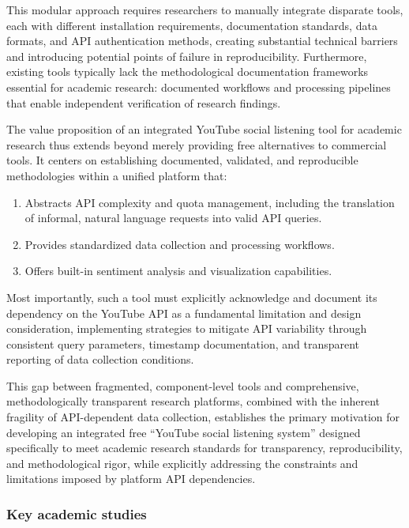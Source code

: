 This modular approach requires researchers to manually integrate disparate tools, each with different installation requirements, documentation standards, data formats, and API authentication methods, creating substantial technical barriers and introducing potential points of failure in reproducibility. Furthermore, existing tools typically lack the methodological documentation frameworks essential for academic research: documented workflows and processing pipelines that enable independent verification of research findings.

The value proposition of an integrated YouTube social listening tool for academic research thus extends beyond merely providing free alternatives to commercial tools. It centers on establishing documented, validated, and reproducible methodologies within a unified platform that:

\begin{enumerate}
	\item Abstracts API complexity and quota management, including the translation of informal, natural language requests into valid API queries.

	\item Provides standardized data collection and processing workflows.

	\item Offers built-in sentiment analysis and visualization capabilities.
\end{enumerate}

Most importantly, such a tool must explicitly acknowledge and document its dependency on the YouTube API as a fundamental limitation and design consideration, implementing strategies to mitigate API variability through consistent query parameters, timestamp documentation, and transparent reporting of data collection conditions.

This gap between fragmented, component-level tools and comprehensive, methodologically transparent research platforms, combined with the inherent fragility of API-dependent data collection, establishes the primary motivation for developing an integrated free \enquote{YouTube social listening system} designed specifically to meet academic research standards for transparency, reproducibility, and methodological rigor, while explicitly addressing the constraints and limitations imposed by platform API dependencies.

\subsubsection{Key academic studies}

